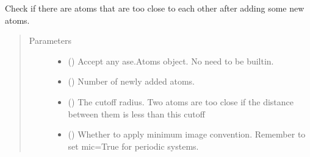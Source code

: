 \documentclass[letterpaper,10pt,english]{sphinxmanual}
\begin{document}
\begin{fulllineitems}
\label{\detokenize{utilities:acat.utilities.atoms_too_close_after_addition}}
Check if there are atoms that are too close to each other after
adding some new atoms.
\begin{quote}\begin{description}
\item[{Parameters}] \leavevmode\begin{itemize}
\item {} 
 () \textendash{} Accept any ase.Atoms object. No need to be built\sphinxhyphen{}in.

\item {} 
 () \textendash{} Number of newly added atoms.

\item {} 
 (\sphinxstyleliteralemphasis{\sphinxupquote{, }}) \textendash{} The cutoff radius. Two atoms are too close if the distance between
them is less than this cutoff

\item {} 
 (\sphinxstyleliteralemphasis{\sphinxupquote{, }}) \textendash{} Whether to apply minimum image convention. Remember to set
mic=True for periodic systems.

\end{itemize}

\end{description}\end{quote}

\end{fulllineitems}

\end{document}
